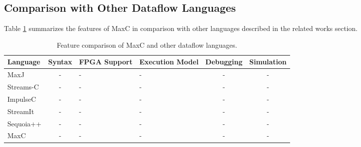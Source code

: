 \subsection{Comparison with Other Dataflow Languages}

Table \ref{table:feature-comparison} summarizes the features of MaxC
in comparison with other languages described in the related works
section.

\begin{table}[!h]
  \renewcommand{\arraystretch}{1.3}
  \centering
  \caption{Feature comparison of MaxC and other dataflow languages.}
  \label{table:feature-comparison}
  \begin{tabular}{ l | c |  p{1cm} |  p{1cm} |  c |  c }
    Language  & Syntax & FPGA Support & Execution Model & Debugging & Simulation \\ \hline
    MaxJ      & -      & -            & -               & -         & -          \\
    Streams-C & -      & -            & -               & -         & -          \\
    ImpulseC  & -      & -            & -               & -         & -          \\
    StreamIt  & -      & -            & -               & -         & -          \\
    Sequoia++ & -      & -            & -               & -         & -          \\
    MaxC      & -      & -            & -               & -         & -          \\
  \end{tabular}
\end{table}


